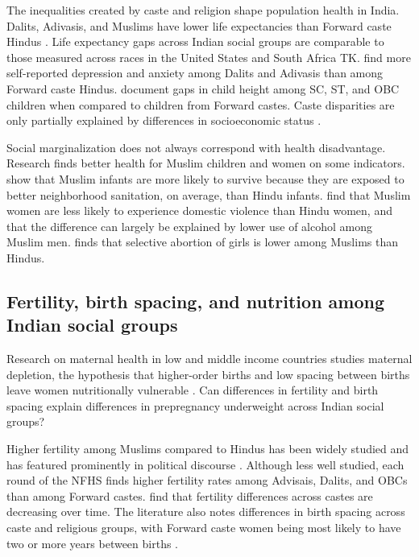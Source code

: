\documentclass[12pt]{article}
\begin{document}
The inequalities created by caste and religion shape population health in India. Dalits, Adivasis, and Muslims have lower life expectancies than Forward caste Hindus \citep{vyas2022social, gupta2022large}.  Life expectancy gaps across Indian social groups are comparable to those measured across races in the United States and South Africa \citep{geruso2012black} TK. \cite{gupta2020caste} find more self-reported depression and anxiety among Dalits and Adivasis than among Forward caste Hindus.  \cite{coffey2019local} document gaps in child height among SC, ST, and OBC children when compared to children from Forward castes. Caste disparities are only partially explained by differences in socioeconomic status \citep{bora2019persistent, kumar2016explaining, van2009decomposing, vyas2022social, dutta2020effect}. 

Social marginalization does not always correspond with health disadvantage.  Research finds better health for Muslim children and women on some indicators.  \cite{geruso2018neighborhood} show that Muslim infants are more likely to survive because they are exposed to better neighborhood sanitation, on average, than Hindu infants. \cite{sharma_gupta_2025} find that Muslim women are less likely to experience domestic violence than Hindu women, and that the difference can largely be explained by lower use of alcohol among Muslim men.  \cite{visaria2015preference} finds that selective abortion of girls is lower among Muslims than Hindus. 

\subsection{Fertility, birth spacing, and nutrition among Indian social groups}

Research on maternal health in low and middle income countries studies maternal depletion, the hypothesis that higher-order births and low spacing between births leave women nutritionally vulnerable \citep{winkvist1992new, king2003risk, shell2004maternal, bauserman2020relationship}.  Can differences in fertility and birth spacing explain differences in prepregnancy underweight across Indian social groups? 

Higher fertility among Muslims compared to Hindus has been widely studied \citep{dharmalingam2004pervasive, bhat2005role, james2005accelerated} and has featured prominently in political discourse \citep{jeffery2002population, singh2020numbering}.  Although less well studied, each round of the NFHS finds higher fertility rates among Advisais, Dalits, and OBCs than among Forward castes. \cite{srinivas2024rapid} find that fertility differences across castes are decreasing over time. The literature also notes differences in birth spacing across caste and religious groups, with Forward caste women being most likely to have two or more years between births \citep{kundu2025short, maity2017comparing, bhalotra2008birth, singh2024wealth}.  
\end{document}
